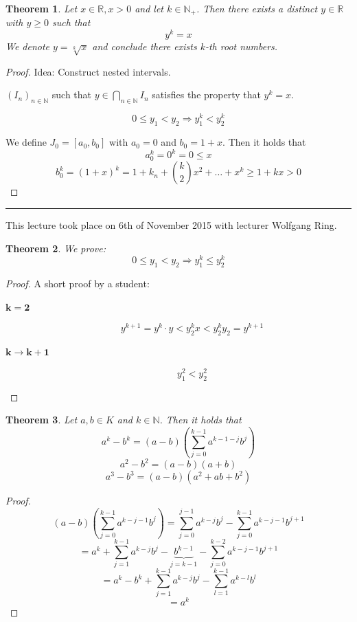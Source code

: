 \documentclass[a4paper,landscape,twocolumn]{article}
\newtheorem{theorem}{Theorem}
\newcommand\meta[3]{\hrule{} This #1 took place on #2 with lecturer #3.\par}
\begin{document}
\begin{theorem}
  Let $x \in \mathbb R, x > 0$ and let $k \in \mathbb N_+$.
  Then there exists a distinct $y \in \mathbb R$ with $y \geq 0$
  such that
  \[ y^k = x \]
  We denote $y = \sqrt[k]{x}$ and conclude there exists $k$-th root numbers.
\end{theorem}

\begin{proof}
  Idea: Construct nested intervals.

  $(I_n)_{n \in \mathbb N}$ such that $y \in \bigcap_{n \in \mathbb N} I_n$
  satisfies the property that $y^k = x$.

  \[ 0 \leq y_1 < y_2 \Rightarrow y_1^k < y_2^k \]

  We define $J_0 = [a_0, b_0]$ with $a_0 = 0$ and $b_0 = 1 + x$.
  Then it holds that
  \[ a_0^k = 0^k = 0 \leq x \]
  \[ b_0^k = (1 + x)^k = 1 + k_n + \binom{k}{2} x^2 + \dots + x^k \geq 1 + kx > 0 \]
\end{proof}

\meta{lecture}{6th of November 2015}{Wolfgang Ring}

\begin{theorem}
  We prove:
  \[ 0 \leq y_1 < y_2 \Rightarrow y_1^k \leq y_2^k \]
\end{theorem}
\begin{proof}
  A short proof by a student:
  \begin{description}
    \item[$\mathbf{k = 2}$]
      \[ y^{k+1} = y^k \cdot y < y_2^k x < y_2^k y_2 = y^{k+1} \]
    \item[$\mathbf{k \rightarrow k + 1}$]
      \[ y_1^2 < y_2^2 \]
  \end{description}
\end{proof}

\begin{theorem}
  Let $a, b \in K$ and $k \in \mathbb N$.
  Then it holds that
  \[ a^k - b^k = (a - b)\left(\sum_{j=0}^{k-1} a^{k-1-j} b^j\right) \]
  \[ a^2 - b^2 = (a - b)(a + b) \]
  \[ a^3 - b^3 = (a - b)(a^2 + ab + b^2) \]
\end{theorem}

\begin{proof}
  \[
    (a - b)\left(\sum_{j=0}^{k-1} a^{k-j-1} b^j\right)
    = \sum_{j=0}^{j-1} a^{k-j} b^j - \sum_{j=0}^{k-1} a^{k-j-1} b^{j+1}
  \] \[
    = a^k + \sum_{j=1}^{k-1} a^{k-j} b^j - \underbrace{b^{k-1}}_{j=k-1} - \sum_{j=0}^{k-2} a^{k-j-1} b^{j+1}
  \] \[
    = a^k - b^k + \sum_{j=1}^{k-1} a^{k-j} b^j - \sum_{l=1}^{k-1} a^{k-l} b^l
  \] \[
    = a^k
  \]
\end{proof}
\end{document}
